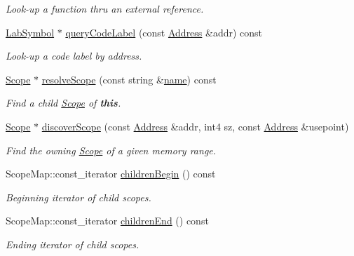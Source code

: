 \begin{DoxyCompactItemize}
\begin{DoxyCompactList}\small\item\em Look-\/up a function thru an {\itshape external} {\itshape reference}. \end{DoxyCompactList}\item 
\mbox{\hyperlink{class_lab_symbol}{Lab\+Symbol}} $\ast$ \mbox{\hyperlink{class_scope_a88982df383433525505723b19b8aaa13}{query\+Code\+Label}} (const \mbox{\hyperlink{class_address}{Address}} \&addr) const
\begin{DoxyCompactList}\small\item\em Look-\/up a code label by address. \end{DoxyCompactList}\item 
\mbox{\hyperlink{class_scope}{Scope}} $\ast$ \mbox{\hyperlink{class_scope_a3b252ca0ce3155c06fe0cee6eae9265b}{resolve\+Scope}} (const string \&\mbox{\hyperlink{class_scope_abb4900f6409e8a82c1b1cea827e4e2c5}{name}}) const
\begin{DoxyCompactList}\small\item\em Find a child \mbox{\hyperlink{class_scope}{Scope}} of {\bfseries{this}}. \end{DoxyCompactList}\item 
\mbox{\hyperlink{class_scope}{Scope}} $\ast$ \mbox{\hyperlink{class_scope_aaef5f179b42a9696fd077dbc7144ecc2}{discover\+Scope}} (const \mbox{\hyperlink{class_address}{Address}} \&addr, int4 sz, const \mbox{\hyperlink{class_address}{Address}} \&usepoint)
\begin{DoxyCompactList}\small\item\em Find the owning \mbox{\hyperlink{class_scope}{Scope}} of a given memory range. \end{DoxyCompactList}\item 
Scope\+Map\+::const\+\_\+iterator \mbox{\hyperlink{class_scope_ac99df3971e5fd3927fedeafc3c446346}{children\+Begin}} () const
\begin{DoxyCompactList}\small\item\em Beginning iterator of child scopes. \end{DoxyCompactList}\item 
Scope\+Map\+::const\+\_\+iterator \mbox{\hyperlink{class_scope_a9e38201042b6bc4009f39d718c28297b}{children\+End}} () const
\begin{DoxyCompactList}\small\item\em Ending iterator of child scopes. \end{DoxyCompactList}\item 

\end{DoxyCompactItemize}

